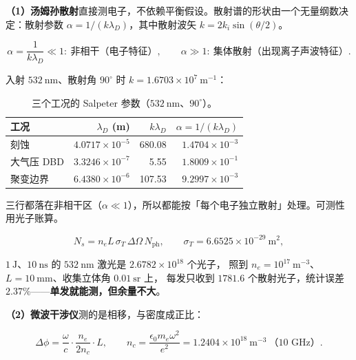 \textbf{（1）汤姆孙散射}直接测电子，不依赖平衡假设。散射谱的形状由一个无量纲数决定：散射参数
$\alpha=1/(k\lambda_D)$，其中散射波矢 $k=2k_i\sin(\theta/2)$。

\begin{equation}
  \alpha = \frac{1}{k\lambda_D} \ll 1:\ \text{非相干（电子特征）},
  \qquad
  \alpha \gg 1:\ \text{集体散射（出现离子声波特征）}.
  \label{eq:app-q-salpeter}
\end{equation}

入射 $532\ \mathrm{nm}$、散射角 $90^\circ$ 时 $k=1.6703\times10^{7}\ \mathrm{m^{-1}}$：

\begin{table}[htbp]
  \centering
  \caption{三个工况的 Salpeter 参数（$532\ \mathrm{nm}$、$90^\circ$）。}
  \label{tab:app-q-salpeter}
  \begin{tabular}{@{}lrrr@{}}
    \toprule
    工况 & $\lambda_D$ (m) & $k\lambda_D$ & $\alpha=1/(k\lambda_D)$ \\
    \midrule
    刻蚀 & $4.0717\times10^{-5}$ & 680.08 & $1.4704\times10^{-3}$ \\
    大气压 DBD & $3.3246\times10^{-7}$ & 5.55 & $1.8009\times10^{-1}$ \\
    聚变边界 & $6.4380\times10^{-6}$ & 107.53 & $9.2997\times10^{-3}$ \\
    \bottomrule
  \end{tabular}
\end{table}

三行都落在非相干区（$\alpha\ll1$），所以都能按「每个电子独立散射」处理。可测性用光子账算。

\begin{equation}
  N_s = n_e L\,\sigma_T\,\Delta\Omega\,N_{\mathrm{ph}},
  \qquad
  \sigma_T = 6.6525\times10^{-29}\ \mathrm{m^2},
  \label{eq:app-q-photons}
\end{equation}

$1\ \mathrm{J}$、$10\ \mathrm{ns}$ 的 $532\ \mathrm{nm}$ 激光是 $2.6782\times10^{18}$ 个光子，
照到 $n_e=10^{17}\ \mathrm{m^{-3}}$、$L=10\ \mathrm{mm}$、收集立体角 $0.01\ \mathrm{sr}$ 上，
每发只收到 $1781.6$ 个散射光子，统计误差 $2.37\%$——\textbf{单发就能测，但余量不大}。

\textbf{（2）微波干涉仪}测的是相移，与密度成正比：

\begin{equation}
  \Delta\phi = \frac{\omega}{c}\cdot\frac{n_e}{2n_c}\cdot L,
  \qquad
  n_c = \frac{\epsilon_0m_e\omega^2}{e^2} = 1.2404\times10^{18}\ \mathrm{m^{-3}}\ \text{（10 GHz）}.
  \label{eq:app-q-microwave}
\end{equation}

